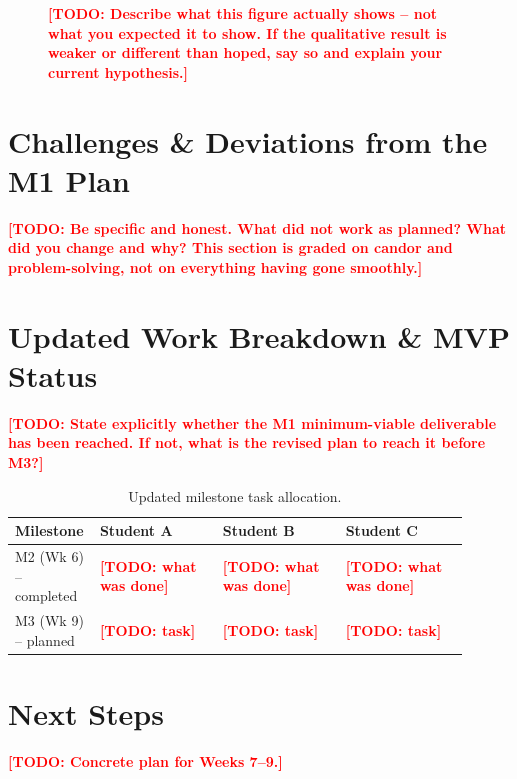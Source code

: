 \documentclass[11pt]{article}
\newcommand{\todo}[1]{\textcolor{red}{\textbf{[TODO: #1]}}}
\begin{document}
\begin{figure}[h]
\centering
\caption{\todo{Describe what this figure actually shows -- not what you expected it to
show. If the qualitative result is weaker or different than hoped, say so and explain
your current hypothesis.}}
\label{fig:prelim}
\end{figure}

\section{Challenges \& Deviations from the M1 Plan}
\label{sec:challenges}
\todo{Be specific and honest. What did not work as planned? What did you change and
why? This section is graded on candor and problem-solving, not on everything having
gone smoothly.}

\section{Updated Work Breakdown \& MVP Status}
\label{sec:workbreakdown}
\todo{State explicitly whether the M1 minimum-viable deliverable has been reached. If
not, what is the revised plan to reach it before M3?}

\begin{table}[h]
\centering
\caption{Updated milestone task allocation.}
\label{tab:tasks}
\begin{tabular}{@{}p{0.12\linewidth}p{0.26\linewidth}p{0.26\linewidth}p{0.26\linewidth}@{}}
\toprule
\textbf{Milestone} & \textbf{Student A} & \textbf{Student B} & \textbf{Student C} \\
\midrule
M2 (Wk 6) -- completed & \todo{what was done} & \todo{what was done} & \todo{what was done} \\
M3 (Wk 9) -- planned   & \todo{task} & \todo{task} & \todo{task} \\
\bottomrule
\end{tabular}
\end{table}

\section{Next Steps}
\label{sec:next}
\todo{Concrete plan for Weeks 7--9.}



\end{document}
